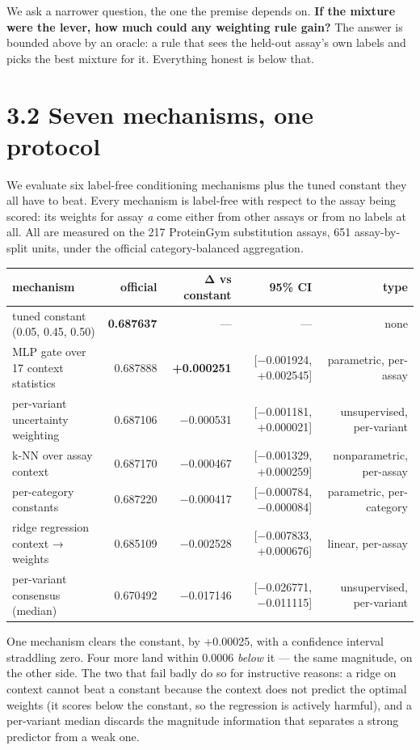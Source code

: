 \documentclass[sigconf,review,nonacm]{acmart}
\begin{document}
We ask a narrower question, the one the premise depends on. \textbf{If the mixture were the lever, how much
could any weighting rule gain?} The answer is bounded above by an oracle: a rule that sees the
held-out assay's own labels and picks the best mixture for it. Everything honest is below that.

\hypertarget{seven-mechanisms-one-protocol}{%
\section{3.2 Seven mechanisms, one protocol}\label{seven-mechanisms-one-protocol}}

We evaluate six label-free conditioning mechanisms plus the tuned constant they all have to beat. Every
mechanism is label-free with respect to the assay being scored: its weights for assay \emph{a} come either
from other assays or from no labels at all. All are measured on the 217 ProteinGym substitution assays,
651 assay-by-split units, under the official category-balanced aggregation.

\begin{table}[t]
\centering
\small
\begin{tabular}{lrrrr}
\hline
mechanism & official & Δ vs constant & 95\% CI & type \\
\hline
tuned constant (0.05, 0.45, 0.50) & \textbf{0.687637} & — & — & none \\
MLP gate over 17 context statistics & 0.687888 & \textbf{+0.000251} & [−0.001924, +0.002545] & parametric, per-assay \\
per-variant uncertainty weighting & 0.687106 & −0.000531 & [−0.001181, +0.000021] & unsupervised, per-variant \\
k-NN over assay context & 0.687170 & −0.000467 & [−0.001329, +0.000259] & nonparametric, per-assay \\
per-category constants & 0.687220 & −0.000417 & [−0.000784, −0.000084] & parametric, per-category \\
ridge regression context → weights & 0.685109 & −0.002528 & [−0.007833, +0.000676] & linear, per-assay \\
per-variant consensus (median) & 0.670492 & −0.017146 & [−0.026771, −0.011115] & unsupervised, per-variant \\
\hline
\end{tabular}
\end{table}

One mechanism clears the constant, by +0.00025, with a confidence interval straddling zero. Four more
land within 0.0006 \emph{below} it --- the same magnitude, on the other side. The two that fail badly do so for
instructive reasons: a ridge on context cannot beat a constant because the context does not predict the
optimal weights (it scores below the constant, so the regression is actively harmful), and a per-variant
median discards the magnitude information that separates a strong predictor from a weak one.
\end{document}
